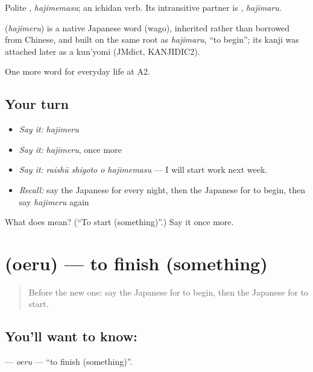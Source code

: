 Polite \textbf{}, \emph{hajimemasu}; an ichidan verb. Its intransitive partner is \textbf{}, \emph{hajimaru}.

\begin{cousinweb}
\textbf{} (\emph{hajimeru}) is a native Japanese word (wago), inherited rather than borrowed from Chinese, and built on the same root as \emph{hajimaru}, \textquotedblleft{}to begin\textquotedblright{}; its kanji was attached later as a kun'yomi (JMdict, KANJIDIC2).
\end{cousinweb}

\begin{grammarlens}[title={What you've built}]
One more word for everyday life at A2.
\end{grammarlens}

\subsection*{Your turn}
\begin{itemize}
\raggedright
  \item \emph{Say it:} \emph{hajimeru}
  \item \emph{Say it:} \emph{hajimeru}, once more
  \item \emph{Say it:} \emph{raishū shigoto o hajimemasu} — I will start work next week.
  \item \emph{Recall:} say the Japanese for every night, then the Japanese for to begin, then say \emph{hajimeru} again
\end{itemize}

\begin{tcolorbox}[breakable,colback=teal!4,colframe=teal!35!black,title={Before you move on}]
What does  mean? (\textquotedblleft{}To start (something)\textquotedblright{}.) Say it once more.
\end{tcolorbox}
\section[\texorpdfstring{\ja{おえる} (oeru)}{おえる (oeru)}]{ (oeru) — to finish (something)}

\label{lesson:JA-C167-oeru}



\begin{quote}
Before the new one: say the Japanese for to begin, then the Japanese for to start.
\end{quote}

\subsection*{You'll want to know: }
\textbf{} — \emph{oeru} — \textquotedblleft{}to finish (something)\textquotedblright{}.


